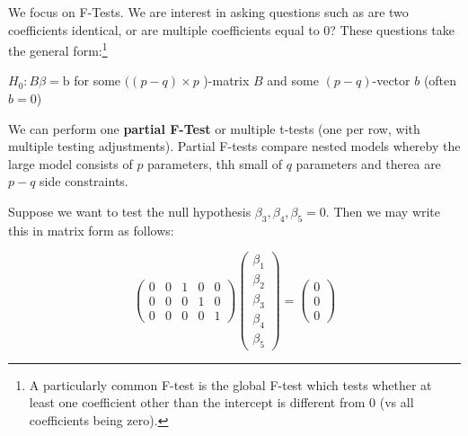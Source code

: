 \documentclass[11pt, %
	oneside, %
	english, %
	onehalfspacing, %
	]{article} %
\numberwithin{equation}{section}
\begin{document}
We focus on F-Tests. We are interest in asking questions such as are two coefficients identical, or are multiple coefficients equal to 0? These questions take the general form:\footnote{A particularly common F-test is the global F-test which tests whether at least one coefficient other than the intercept is different from 0 (vs all coefficients being zero).}

\begin{center}
    $H_0: B \beta=\mathrm{b}$ for some $((p-q) \times p$ )-matrix $B$ and some $(p-q)$-vector $b$ (often $b=0$)
\end{center}

We can perform one \textbf{partial F-Test} or multiple t-tests (one per row, with multiple testing adjustments). Partial F-tests compare nested models whereby the large model consists of $p$ parameters, thh small of $q$ parameters and therea are $p-q$ side constraints.

\begin{example}{}{}
    Suppose we want to test the null hypothesis $\beta_3,\beta_4, \beta_5 = 0$. Then we may write this in matrix form as follows:

    \begin{equation*}
        \left(\begin{array}{lllll}
            0 & 0 & 1 & 0 & 0 \\
            0 & 0 & 0 & 1 & 0 \\
            0 & 0 & 0 & 0 & 1
        \end{array}\right)
        \left(\begin{array}{l}
            \beta_1 \\
            \beta_2 \\
            \beta_3 \\
            \beta_4 \\
            \beta_5
        \end{array}\right)
            =
        \left(\begin{array}{l}
            0 \\
            0 \\
            0
        \end{array}\right)
    \end{equation*}
\end{example}
\end{document}
